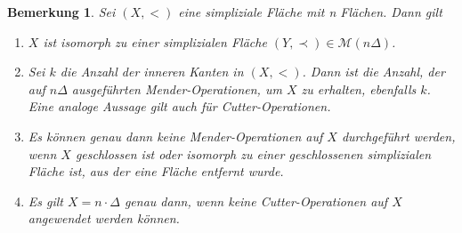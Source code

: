 \documentclass[12pt,titlepage,twoside,cleardoublepage]{article}
\theoremstyle{nummermitklammern}
\newtheorem{bemerkung}[temp]{Bemerkung}
\newtheorem{bemerkung}[zahl]{Bemerkung}
\numberwithin{equation}{section}
\begin{document}
  \begin{bemerkung}
  Sei $(X,<)$ eine simpliziale Fläche mit n Flächen. Dann gilt
  \begin{enumerate}
  \item $X$ ist isomorph zu einer simplizialen Fläche $(Y,\prec) \in \mathcal{M}(n\Delta)$.
  \item Sei $k$ die Anzahl der inneren Kanten in $(X,<)$. Dann ist die Anzahl, der auf $n\Delta$ ausgeführten Mender-Operationen, um $X$ zu erhalten, ebenfalls $k$. Eine analoge Aussage gilt auch für Cutter-Operationen.
  \item Es können genau dann keine Mender-Operationen auf $X$ durchgeführt werden, wenn $X$ geschlossen ist oder isomorph zu einer geschlossenen simplizialen Fläche ist, aus der eine Fläche entfernt wurde.
  \item Es gilt $X=n \cdot \Delta$ genau dann, wenn keine Cutter-Operationen auf $X$ angewendet werden können.
  \end{enumerate}
  \end{bemerkung}
  
\newpage
\end{document}
